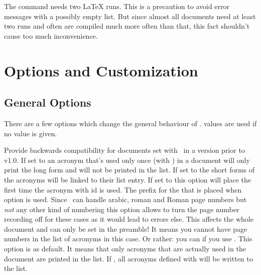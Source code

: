 \documentclass[load-preamble+,scrartcl={DIV10}]{cnltx-doc}
\begin{document}
The command  needs two \LaTeX{} runs.  This is a precaution
to avoid error messages with a possibly empty list.  But since almost all
documents need at least two runs and often are compiled much more often than
that, this fact shouldn't cause too much inconvenience.

\section{Options and Customization}\label{sec:customization}
\subsection{General Options}
There are a few options which change the general behaviour of \acro.
 values are used if no value is given.
\begin{options}
    Provide backwards compatibility for documents set with \acro\ in a version
    prior to v1.0.
    If set to  an acronym that's used only once (with ) in a
    document will only print the long form and will not be printed in the list.
    If set to  the short forms of the acronyms will be linked to
    their list entry.
    If set to  this option will place
     the first time the acronym with
    \ac{id}  is used.
    The prefix for the  that is placed when
    option  is used.
    Since \acro\ can handle arabic, roman and Roman page numbers but
    \emph{not} any other kind of numbering this option allows to turn the page
    number recording off for these cases as it would lead to errors else.
    This affects the whole document and can only be set in the preamble!  It
    means you cannot have page numbers in the list of acronyms in this case.
    Or rather: you can if you use .
    This option is  as default.  It means that only acronyms that
    are actually used in the document are printed in the list.  If
    , all acronyms defined with  will be
    written to the list.

\end{options}
\end{document}
